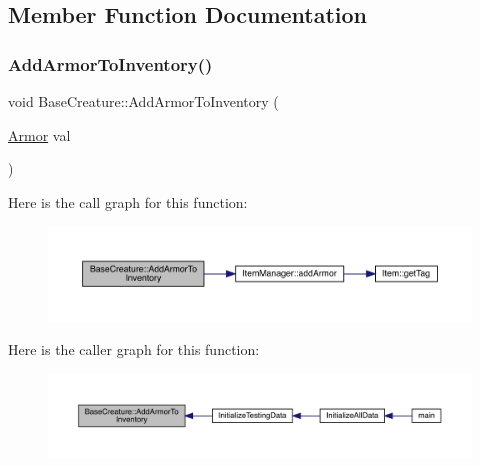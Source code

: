 \subsection{Member Function Documentation}
\mbox{\label{class_base_creature_a03122a2c070fe7cab0dc772f552f1a63}} 
\subsubsection{\texorpdfstring{Add\+Armor\+To\+Inventory()}{AddArmorToInventory()}}
{\footnotesize\ttfamily void Base\+Creature\+::\+Add\+Armor\+To\+Inventory (\begin{DoxyParamCaption}\item[{\mbox{\hyperlink{class_armor}{Armor}}}]{val }\end{DoxyParamCaption})}

Here is the call graph for this function\+:
\nopagebreak
\begin{figure}[H]
\begin{center}
\leavevmode
\includegraphics[width=350pt]{d2/d3b/class_base_creature_a03122a2c070fe7cab0dc772f552f1a63_cgraph}
\end{center}
\end{figure}
Here is the caller graph for this function\+:
\nopagebreak
\begin{figure}[H]
\begin{center}
\leavevmode
\includegraphics[width=350pt]{d2/d3b/class_base_creature_a03122a2c070fe7cab0dc772f552f1a63_icgraph}
\end{center}
\end{figure}
\mbox{\label{class_base_creature_ab6f0139afb4e1b15d5f1feecc267580d}} 
